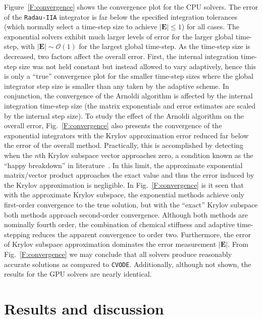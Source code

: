 \documentclass[preprint]{elsarticle}
\begin{document}
Figure~\ref{F:convergence} shows the convergence plot for the CPU solvers.
The error of the \texttt{Radau-IIA} integrator is far below the specified integration tolerances (which normally select a time-step size to achieve $\left\lvert\textbf{E}\right\rvert \leq 1$) for all cases.
The exponential solvers exhibit much larger levels of error for the larger global time-step, with $\left\lvert\textbf{E}\right\rvert \sim \mathcal{O}(1)$ for the largest global time-step.
As the time-step size is decreased, two factors affect the overall error.
First, the internal integration time-step size was not held constant but instead allowed to vary adaptively, hence this is only a ``true'' convergence plot for the smaller time-step sizes where the global integrator step size is smaller than any taken by the adaptive scheme.
In conjunction, the convergence of the Arnoldi algorithm is affected by the internal integration time-step size (the matrix exponentials and error estimates are scaled by the internal step size).
To study the effect of the Arnoldi algorithm on the overall error, Fig.~\ref{F:convergence} also presents the convergence of the exponential integrators with the Krylov approximation error reduced far below the error of the overall method.
Practically, this is accomplished by detecting when the $n$th Krylov subspace vector approaches zero, a condition known as the ``happy breakdown'' in literature~\cite{datta2010numerical}.
In this limit, the approximate exponential matrix\slash vector product approaches the exact value and thus the error induced by the Krylov approximation is negligible.
In Fig.~\ref{F:convergence} is it seen that with the approximate Krylov subspace, the exponential methods achieve only first-order convergence to the true solution, but with the ``exact'' Krylov subspace both methods approach second-order convergence.
Although both methods are nominally fourth order, the combination of chemical stiffness and adaptive time-stepping reduces the apparent convergence to order two.
Furthermore, the error of Krylov subspace approximation dominates the error measurement $\lvert\textbf{E}\rvert$.
From Fig.~\ref{F:convergence} we may conclude that all solvers produce reasonably accurate solutions as compared to \texttt{CVODE}.
Additionally, although not shown, the results for the GPU solvers are nearly identical.


\section{Results and discussion}
\label{S:results}
\end{document}
